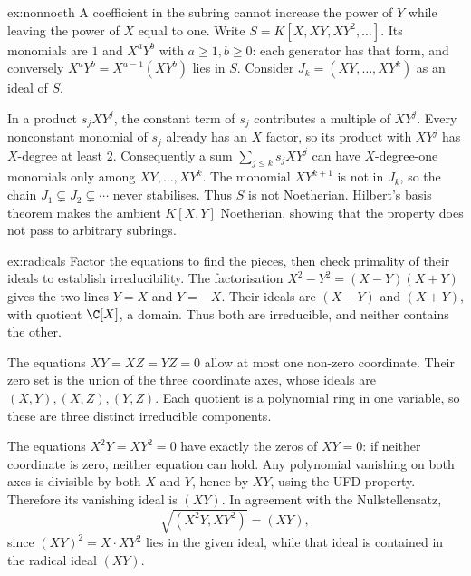 \begin{solution}{ex:nonnoeth}
\idea A coefficient in the subring cannot increase the power of $Y$ while leaving the power of $X$ equal to one.
\writeup Write $S=K[X,XY,XY^2,\ldots]$. Its monomials are $1$ and $X^aY^b$ with $a\ge1,b\ge0$: each generator has that form, and conversely $X^aY^b=X^{a-1}(XY^b)$ lies in $S$. Consider $J_k=(XY,\ldots,XY^k)$ as an ideal of $S$.

In a product $s_jXY^j$, the constant term of $s_j$ contributes a multiple of $XY^j$. Every nonconstant monomial of $s_j$ already has an $X$ factor, so its product with $XY^j$ has $X$-degree at least $2$. Consequently a sum $\sum_{j\le k}s_jXY^j$ can have $X$-degree-one monomials only among $XY,\ldots,XY^k$. The monomial $XY^{k+1}$ is not in $J_k$, so the chain $J_1\subsetneq J_2\subsetneq\cdots$ never stabilises. Thus $S$ is not Noetherian. Hilbert's basis theorem makes the ambient $K[X,Y]$ Noetherian, showing that the property does not pass to arbitrary subrings.
\end{solution}

\begin{solution}{ex:radicals}
\idea Factor the equations to find the pieces, then check primality of their ideals to establish irreducibility.
\writeup The factorisation $X^2-Y^2=(X-Y)(X+Y)$ gives the two lines $Y=X$ and $Y=-X$. Their ideals are $(X-Y)$ and $(X+Y)$, with quotient $\C[X]$, a domain. Thus both are irreducible, and neither contains the other.

The equations $XY=XZ=YZ=0$ allow at most one non-zero coordinate. Their zero set is the union of the three coordinate axes, whose ideals are $(X,Y),(X,Z),(Y,Z)$. Each quotient is a polynomial ring in one variable, so these are three distinct irreducible components.

The equations $X^2Y=XY^2=0$ have exactly the zeros of $XY=0$: if neither coordinate is zero, neither equation can hold. Any polynomial vanishing on both axes is divisible by both $X$ and $Y$, hence by $XY$, using the UFD property. Therefore its vanishing ideal is $(XY)$. In agreement with the Nullstellensatz,
\[
\sqrt{(X^2Y,XY^2)}=(XY),
\]
since $(XY)^2=X\cdot XY^2$ lies in the given ideal, while that ideal is contained in the radical ideal $(XY)$.
\end{solution}

